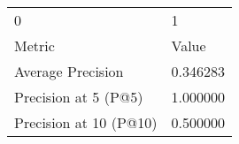 \begin{tabular}{ll}
0 & 1 \\
Metric & Value \\
Average Precision & 0.346283 \\
Precision at 5 (P@5) & 1.000000 \\
Precision at 10 (P@10) & 0.500000 \\
\end{tabular}
